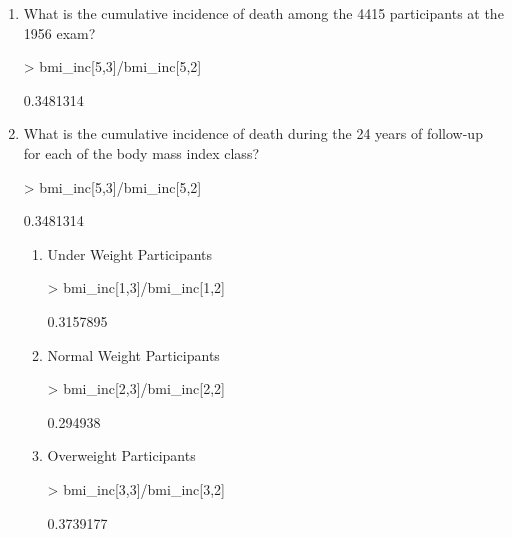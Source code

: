 \documentclass{article}
\begin{document}
\begin{enumerate}
\item 
What is the cumulative incidence of death among the 4415 participants at the 1956 exam?
\begin{Schunk}
\begin{Sinput}
> bmi_inc[5,3]/bmi_inc[5,2]
\end{Sinput}
\begin{Soutput}
[1] 0.3481314
\end{Soutput}
\end{Schunk}


\item What is the cumulative incidence of death during the 24 years of follow-up for each of the body mass index class?\\

\begin{Schunk}
\begin{Sinput}
> bmi_inc[5,3]/bmi_inc[5,2]
\end{Sinput}
\begin{Soutput}
[1] 0.3481314
\end{Soutput}
\end{Schunk}

\begin{enumerate}
\item Under Weight Participants

\begin{Schunk}
\begin{Sinput}
> bmi_inc[1,3]/bmi_inc[1,2]
\end{Sinput}
\begin{Soutput}
[1] 0.3157895
\end{Soutput}
\end{Schunk}

\item Normal Weight Participants

\begin{Schunk}
\begin{Sinput}
> bmi_inc[2,3]/bmi_inc[2,2]
\end{Sinput}
\begin{Soutput}
[1] 0.294938
\end{Soutput}
\end{Schunk}


\item Overweight Participants

\begin{Schunk}
\begin{Sinput}
> bmi_inc[3,3]/bmi_inc[3,2]
\end{Sinput}
\begin{Soutput}
[1] 0.3739177
\end{Soutput}
\end{Schunk}


\end{enumerate}
\end{enumerate}
\end{document}
